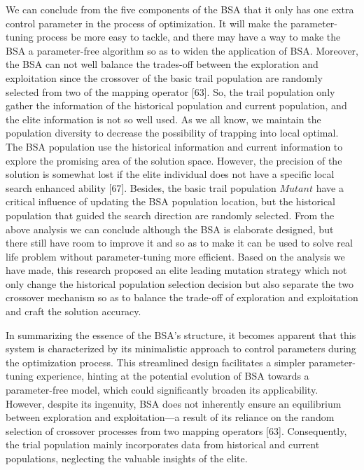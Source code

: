 \documentclass{article} %
\begin{document}
 We can conclude from the five components of the BSA that it only has one extra control parameter in the process of optimization. It will make the parameter-tuning process be more easy to tackle, and there may have a way to make the BSA a parameter-free algorithm so as to widen the application of BSA. Moreover, the BSA can not well balance the trades-off between the exploration and exploitation since the crossover of the basic trail population are randomly selected from two of the mapping operator [63]. So, the trail population only gather the information of the historical population and current population, and the elite information is not so well used. As we all know, we maintain the population diversity to decrease the possibility of trapping into local optimal. The BSA population use the historical information and current information to explore the promising area of the solution space. However, the precision of the solution is somewhat lost if the elite individual does not have a specific local search enhanced ability [67]. Besides, the basic trail population $Mutant$ have a critical influence of updating the BSA population location, but the historical population that guided the search direction are randomly selected. From the above analysis we can conclude although the BSA is elaborate designed, but there still have room to improve it and so as to make it can be used to solve real life problem without parameter-tuning more efficient. Based on the analysis we have made, this research proposed an elite leading mutation strategy which not only change the historical population selection decision but also separate the two crossover mechanism so as to balance the trade-off of exploration and exploitation and craft the solution accuracy.

In summarizing the essence of the BSA's structure, it becomes apparent that this system is characterized by its minimalistic approach to control parameters during the optimization process. This streamlined design facilitates a simpler parameter-tuning experience, hinting at the potential evolution of BSA towards a parameter-free model, which could significantly broaden its applicability. However, despite its ingenuity, BSA does not inherently ensure an equilibrium between exploration and exploitation---a result of its reliance on the random selection of crossover processes from two mapping operators [63]. Consequently, the trial population mainly incorporates data from historical and current populations, neglecting the valuable insights of the elite.
\end{document}
